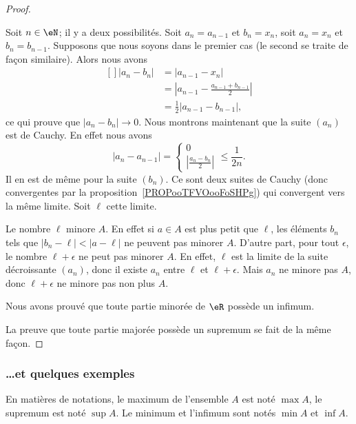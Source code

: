 \begin{proof}
\begin{subproof}
	Soit $n\in\eN$; il y a deux possibilités. Soit $a_n=a_{n-1}$ et $b_n=x_n$, soit $a_n=x_n$ et $b_n=b_{n-1}$. Supposons que nous soyons dans le premier cas (le second se traite de façon similaire). Alors nous avons
	\begin{equation}
		\begin{aligned}[]
			| a_n-b_n |&=| a_{n-1}-x_n |\\
			&=\left| a_{n-1}-\frac{ a_{n-1}+b_{n-1} }{2} \right| \\
			&=\frac{ 1 }{2}| a_{n-1}-b_{n-1} |,
		\end{aligned}
	\end{equation}
	ce qui prouve que $| a_n-b_n |\to 0$. Nous montrons maintenant que la suite \( (a_n)\) est de Cauchy. En effet nous avons
    \begin{equation}
        | a_n-a_{n-1} |=\begin{cases}
          0\\
          \left| \frac{ a_n -b_n}{ 2} \right|
      \end{cases}\leq \frac{1}{ 2n }.
    \end{equation}
    Il en est de même pour la suite \( (b_n)\). Ce sont deux suites de Cauchy (donc convergentes par la proposition~\ref{PROPooTFVOooFoSHPg}) qui convergent vers la même limite. Soit \( \ell\) cette limite.

	Le nombre $\ell$ minore $A$. En effet si $a\in A$ est plus petit que $\ell$, les éléments $b_n$ tels que $| b_n-\ell |<| a-\ell |$ ne peuvent pas minorer $A$. D'autre part, pour tout $\epsilon$, le nombre $\ell+\epsilon$ ne peut pas minorer $A$. En effet, $\ell$ est la limite de la suite décroissante $(a_n)$, donc il existe $a_n$ entre $\ell$ et $\ell+\epsilon$. Mais $a_n$ ne minore pas $A$, donc $\ell+\epsilon$ ne minore pas non plus $A$.

	Nous avons prouvé que toute partie minorée de $\eR$ possède un infimum.
    \end{subproof}

    La preuve que toute partie majorée possède un supremum se fait de la même façon.
\end{proof}

\subsubsection{\ldots et quelques exemples}

En matières de notations, le maximum de l'ensemble $A$ est noté $\max A$, le supremum est noté $\sup A$. Le minimum et l'infimum sont notés $\min A$ et $\inf A$.

